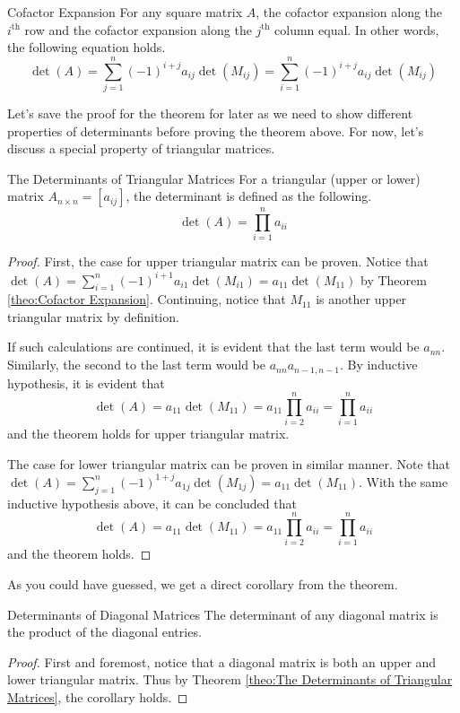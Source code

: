 \documentclass[../../../main.tex]{subfiles}
\begin{document}
\begin{theorem}{}{Cofactor Expansion}
For any square matrix $A$, the cofactor expansion along the
$i^\text{th}$ row and the cofactor expansion along the $j^\text{th}$
column equal. In other words, the following equation holds.
\[
\det(A)
= \sum_{j=1}^n (-1)^{i + j} a_{ij} \det(M_{ij})
= \sum_{i=1}^n (-1)^{i + j} a_{ij} \det(M_{ij})
\]
\end{theorem}

Let's save the proof for the theorem for later as we need to show
different properties of determinants before proving the theorem
above. For now, let's discuss a special property of triangular
matrices.

\begin{theorem}{}{The Determinants of Triangular Matrices}
For a triangular (upper or lower) matrix $A_{n \times n} = [a_{ij}]$,
the determinant is defined as the following.
\[
\det(A)
= \prod_{i=1}^n a_{ii}
\]
\end{theorem}
\begin{proof}
First, the case for upper triangular matrix can be proven. Notice that
$\det(A) = \sum_{i=1}^n (-1)^{i + 1} a_{i1} \det(M_{i1}) =
a_{11} \det(M_{11})$ by Theorem \ref{theo:Cofactor Expansion}.
Continuing, notice that $M_{11}$ is another upper triangular matrix
by definition.

If such calculations are continued, it is evident that the last
term would be $a_{nn}$. Similarly, the second to the last term
would be $a_{nn} a_{n-1,n-1}$. By inductive hypothesis, it is
evident that
\[
\det(A)
= a_{11} \det(M_{11})
= a_{11} \prod_{i=2}^n a_{ii}
= \prod_{i=1}^n a_{ii}
\]
and the theorem holds for upper triangular matrix.

The case for lower triangular matrix can be proven in similar
manner. Note that $\det(A) = \sum_{j=1}^n (-1)^{1 + j} a_{1j}
\det(M_{1j}) = a_{11} \det(M_{11})$. With the same inductive
hypothesis above, it can be concluded that
\[
\det(A)
= a_{11} \det(M_{11})
= a_{11} \prod_{i=2}^n a_{ii}
= \prod_{i=1}^n a_{ii}
\]
and the theorem holds.
\end{proof}

As you could have guessed, we get a direct corollary from the
theorem.

\begin{corollary}{}{Determinants of Diagonal Matrices}
The determinant of any diagonal matrix is the product of the
diagonal entries.
\end{corollary}
\begin{proof}
First and foremost, notice that a diagonal matrix is both
an upper and lower triangular matrix. Thus by Theorem \ref{theo:The
Determinants of Triangular Matrices}, the corollary holds.
\end{proof}
\end{document}
